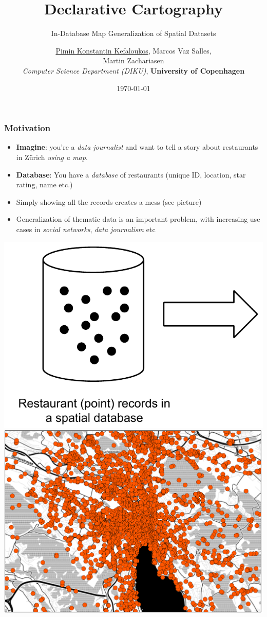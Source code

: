 \documentclass{beamer}
\title{Declarative Cartography}
\subtitle{In-Database Map Generalization of Spatial Datasets}
\author{\underline{Pimin Konstantin Kefaloukos}, Marcos Vaz Salles, \\Martin Zachariasen\\ \small{\emph{Computer Science Department (DIKU)}, \textbf{University of Copenhagen}}}
\date{\today}
\begin{document}
\frame{\titlepage}

\frame
{
  \frametitle{Motivation}
  \begin{itemize}
  \item \textbf{Imagine}: you're a \emph{data journalist} and want to tell a story about restaurants in Z\"{u}rich \emph{using a map}.
  \item \textbf{Database}: You have a \emph{database} of restaurants (unique ID, location, star rating, name etc.)
  \item Simply showing all the records creates a mess (see picture)
  \item Generalization of thematic data is an important problem, with increasing use cases in \emph{social networks}, \emph{data journalism} etc
  \end{itemize}
  \includegraphics[scale=0.5]{figs/spatial-database-with-points.pdf} \includegraphics[scale=0.18]{figs/zurich-unfiltered.pdf}
}
\end{document}
